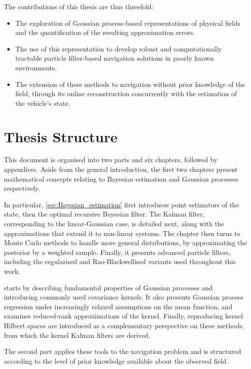 \vspace{\baselineskip}

The contributions of this thesis are thus threefold:
\begin{itemize}
	\item The exploration of Gaussian process-based representations of physical fields and the quantification of the resulting approximation errors.
	\item The use of this representation to develop robust and computationally tractable particle filter-based navigation solutions in poorly known environments.
	\item The extension of these methods to navigation without prior knowledge of the field, through its online reconstruction concurrently with the estimation of the vehicle's state.
\end{itemize}

\section{Thesis Structure}

This document is organised into two parts and six chapters, followed by appendices. Aside from the general introduction, the first two chapters present mathematical concepts relating to Bayesian estimation and Gaussian processes respectively.

In particular, \cref{sec:Bayesian_estimation} first introduces point estimators of the state, then the optimal recursive Bayesian filter. The Kalman filter, corresponding to the linear-Gaussian case, is detailed next, along with the approximations that extend it to non-linear systems. The chapter then turns to Monte Carlo methods to handle more general distributions, by approximating the posterior by a weighted sample. Finally, it presents advanced particle filters, including the regularised and Rao-Blackwellised variants used throughout this work.

 starts by describing fundamental properties of Gaussian processes and introducing commonly used covariance kernels. It also presents Gaussian process regression under increasingly relaxed assumptions on the mean function, and examines reduced-rank approximations of the kernel. Finally, reproducing kernel Hilbert spaces are introduced as a complementary perspective on these methods, from which the kernel Kalman filters are derived.

The second part applies these tools to the navigation problem and is structured according to the level of prior knowledge available about the observed field.

